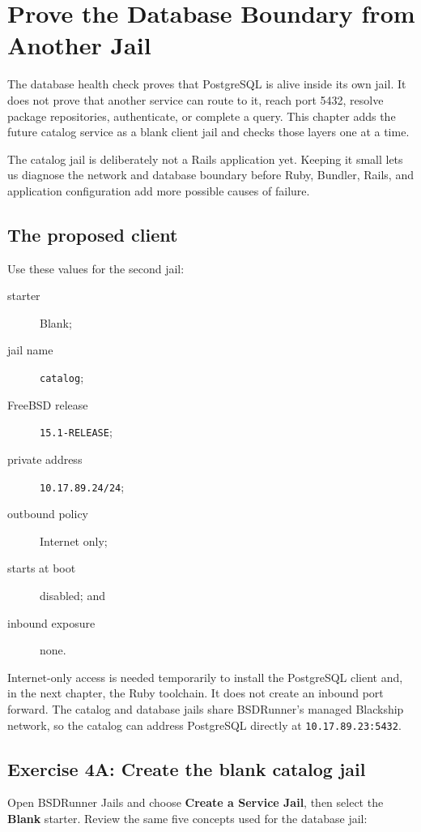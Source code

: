 \chapter{Prove the Database Boundary from Another Jail}

The database health check proves that PostgreSQL is alive inside its own jail.
It does not prove that another service can route to it, reach port 5432, resolve
package repositories, authenticate, or complete a query. This chapter adds the
future catalog service as a blank client jail and checks those layers one at a
time.

The catalog jail is deliberately not a Rails application yet. Keeping it small
lets us diagnose the network and database boundary before Ruby, Bundler, Rails,
and application configuration add more possible causes of failure.

\section{The proposed client}

Use these values for the second jail:

\begin{description}
  \item[starter] Blank;
  \item[jail name] \texttt{catalog};
  \item[FreeBSD release] \texttt{15.1-RELEASE};
  \item[private address] \texttt{10.17.89.24/24};
  \item[outbound policy] Internet only;
  \item[starts at boot] disabled; and
  \item[inbound exposure] none.
\end{description}

Internet-only access is needed temporarily to install the PostgreSQL client and,
in the next chapter, the Ruby toolchain. It does not create an inbound port
forward. The catalog and database jails share BSDRunner's managed Blackship
network, so the catalog can address PostgreSQL directly at
\texttt{10.17.89.23:5432}.

\section{Exercise 4A: Create the blank catalog jail}

Open BSDRunner Jails and choose \textbf{Create a Service Jail}, then select the
\textbf{Blank} starter. Review the same five concepts used for the database
jail:

